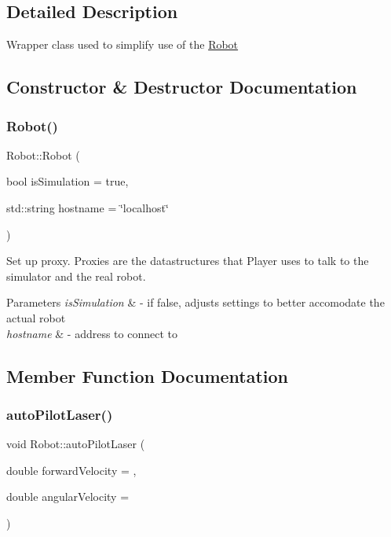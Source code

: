 \subsection{Detailed Description}
Wrapper class used to simplify use of the \hyperlink{classRobot}{Robot} 

\subsection{Constructor \& Destructor Documentation}
\mbox{\label{classRobot_aadf13d050156f275c34eace9e6c3e782}} 
\subsubsection{\texorpdfstring{Robot()}{Robot()}}
{\footnotesize\ttfamily Robot\+::\+Robot (\begin{DoxyParamCaption}\item[{bool}]{is\+Simulation = {\ttfamily true},  }\item[{std\+::string}]{hostname = {\ttfamily \char`\"{}localhost\char`\"{}} }\end{DoxyParamCaption})}

Set up proxy. Proxies are the datastructures that Player uses to talk to the simulator and the real robot.


\begin{DoxyParams}{Parameters}
{\em is\+Simulation} & -\/ if false, adjusts settings to better accomodate the actual robot \\
\hline
{\em hostname} & -\/ address to connect to \\
\hline
\end{DoxyParams}


\subsection{Member Function Documentation}
\mbox{\label{classRobot_a265b1714581af33680485d17bb496526}} 
\subsubsection{\texorpdfstring{auto\+Pilot\+Laser()}{autoPilotLaser()}}
{\footnotesize\ttfamily void Robot\+::auto\+Pilot\+Laser (\begin{DoxyParamCaption}\item[{double}]{forward\+Velocity = {},  }\item[{double}]{angular\+Velocity = {} }\end{DoxyParamCaption})}

